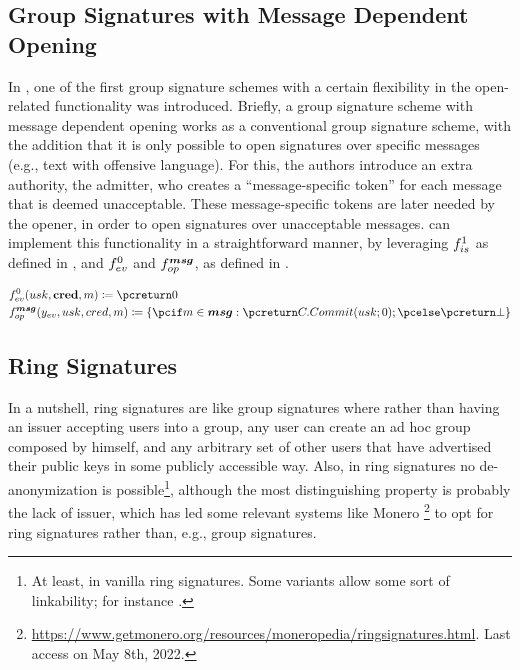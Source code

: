 \subsection{Group Signatures with Message Dependent Opening}
\label{ssec:uas-gsmdo}

In \cite{khk+19}, one of the first group signature schemes with a certain
flexibility in the open-related functionality was introduced. Briefly, a group
signature scheme with message dependent opening works as a conventional group
signature scheme, with the addition that it is only possible to open signatures
over specific messages (e.g., text with offensive language). For this, the
authors introduce an extra authority, the admitter, who creates a
``message-specific token'' for each message that is deemed unacceptable.
These message-specific tokens are later needed by the opener, in order to open
signatures over unacceptable messages. \UAS can implement this functionality in
a straightforward manner, by leveraging $f_{is}^1$ as defined in
, and $f_{ev}^0$ and $f_{op}^{\boldsymbol{msg}}$, as defined in
.

\begin{align}
  & \feval^0(\usk,\scred,\msg) \coloneqq \pcreturn 0 \nonumber \\
  & \finsp^{\smsg}(\yeval,\usk,\cred,\msg) \coloneqq \lbrace \pcif \msg \in \smsg:
    \pcreturn \CCommit(\usk;0); \pcelse \pcreturn \bot \rbrace
    \label{eq:uas-gsmdo-funcs}
\end{align}


\subsection{Ring Signatures}
\label{ssec:uas-ring}

In a nutshell, ring signatures \cite{rst06} are like group signatures where
rather than having an issuer accepting users into a group, any user can create
an ad hoc group composed by himself, and any arbitrary set of other users that
have advertised their public keys in some publicly accessible way. Also, in
ring signatures no de-anonymization is possible\footnote{At least, in vanilla
  ring signatures. Some variants allow some sort of linkability; for instance
  \cite{lww04}.}, although the most distinguishing property is probably the lack
of issuer, which has led some relevant systems like Monero%
\footnote{\url{https://www.getmonero.org/resources/moneropedia/ringsignatures.html}.
  Last access on May 8th, 2022.} to opt for ring signatures rather than, e.g.,
group signatures.

